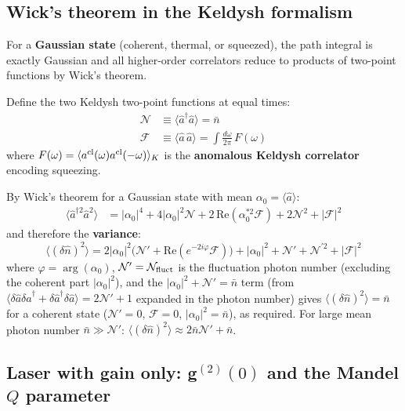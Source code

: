 \documentclass[12pt]{article}
\newcommand{\cl}{{\rm cl}}
\begin{document}
\subsection{Wick's theorem in the Keldysh formalism}

For a \textbf{Gaussian state} (coherent, thermal, or squeezed), the
path integral is exactly Gaussian and all higher-order correlators reduce
to products of two-point functions by Wick's theorem.

Define the two Keldysh two-point functions at equal times:
\begin{align}
  \mathcal{N} &\equiv \langle\hat{a}^\dagger\hat{a}\rangle
  = \bar{n}
  \label{eq:calN}\\
  \mathcal{F} &\equiv \langle\hat{a}\,\hat{a}\rangle
  = \int\frac{d\omega}{2\pi}\,F(\omega)
  \label{eq:calF}
\end{align}
where $F(\omega) = \langle a^\cl(\omega) a^\cl(-\omega)\rangle_K$ is the
\textbf{anomalous Keldysh correlator} encoding squeezing.

By Wick's theorem for a Gaussian state with mean $\alpha_0 = \langle\hat{a}\rangle$:
\begin{align}
  \langle\hat{a}^{\dagger 2}\hat{a}^2\rangle &=
  |\alpha_0|^4 + 4|\alpha_0|^2\mathcal{N}
  + 2\,\mathrm{Re}(\alpha_0^{*2}\mathcal{F})
  + 2\mathcal{N}^2 + |\mathcal{F}|^2
  \label{eq:wick_a4}
\end{align}
and therefore the \textbf{variance}:
\begin{equation}
  \langle(\delta\hat{n})^2\rangle =
  2|\alpha_0|^2\bigl(\mathcal{N}'+\mathrm{Re}(e^{-2i\varphi}\mathcal{F})\bigr)
  + |\alpha_0|^2 + \mathcal{N}'
  + \mathcal{N}^{\prime 2} + |\mathcal{F}|^2
  \label{eq:variance_gaussian}
\end{equation}
where $\varphi = \arg(\alpha_0)$, $\mathcal{N}' = \mathcal{N}_{\rm fluct}$
is the fluctuation photon number (excluding the coherent part $|\alpha_0|^2$),
and the $|\alpha_0|^2 + \mathcal{N}'=\bar{n}$ term (from
$\langle\delta\hat{a}\delta\hat{a}^\dagger+\delta\hat{a}^\dagger\delta\hat{a}\rangle
= 2\mathcal{N}'+1$ expanded in the photon number) gives
$\langle(\delta\hat{n})^2\rangle = \bar{n}$ for a coherent state
($\mathcal{N}'=0$, $\mathcal{F}=0$, $|\alpha_0|^2=\bar{n}$), as required.
For large mean photon number $\bar{n}\gg\mathcal{N}'$:
$\langle(\delta\hat{n})^2\rangle\approx 2\bar{n}\mathcal{N}' + \bar{n}$.

\subsection{Laser with gain only: g\texorpdfstring{$^{(2)}(0)$}{(2)(0)}
and the Mandel $Q$ parameter}
\label{sec:laser_stats}
\end{document}
